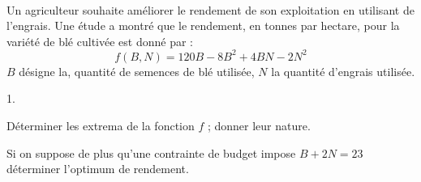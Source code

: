 \documentclass[11pt]{article}%
\begin{document}
\begin{exerciceSP}~\\
  Un agriculteur souhaite améliorer le rendement de son exploitation
  en utilisant de l'engrais. Une étude a montré que le rendement, en
  tonnes par hectare, pour la variété de blé cultivée est donné par :
  \[
  f\left( B,N\right) =120B-8B^{2}+4BN-2N^{2}
  \]
  $B$ désigne la, quantité de semences de blé utilisée, $N$ la
  quantité d'engrais utilisée.
  \begin{noliste}{1.}
    \setlength{\itemsep}{2mm}
  \item Déterminer les extrema de la fonction $f$ ; donner leur nature.
    
  \item Si on suppose de plus qu'une contrainte de budget impose
    $B+2N=23$ déterminer l'optimum de rendement.
  \end{noliste}
\end{exerciceSP}


\newpage
\end{document}
